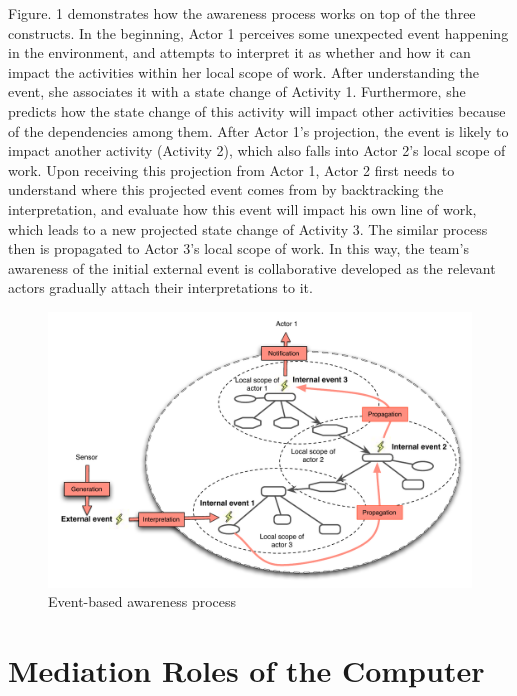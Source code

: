 Figure. 1 demonstrates how the awareness process works on top of the three constructs. In the beginning, Actor 1 perceives some unexpected event happening in the environment, and attempts to interpret it as whether and how it can impact the activities within her local scope of work. After understanding the event, she associates it with a state change of Activity 1. Furthermore, she predicts how the state change of this activity will impact other activities because of the dependencies among them. After Actor 1’s projection, the event is likely to impact another activity (Activity 2), which also falls into Actor 2’s local scope of work. Upon receiving this projection from Actor 1, Actor 2 first needs to understand where this projected event comes from by backtracking the interpretation, and evaluate how this event will impact his own line of work, which leads to a new projected state change of Activity 3. The similar process then is propagated to Actor 3’s local scope of work. In this way, the team’s awareness of the initial external event is collaborative developed as the relevant actors gradually attach their interpretations to it.

\begin{figure}[htbp] %
   \centering
   \includegraphics[width=5.5in]{event_process.pdf} 
   \caption{Event-based awareness process}
   \label{fig:event_process}
\end{figure}

\section{Mediation Roles of the Computer} %
\label{sec:mediation_roles_of_the_computer}

